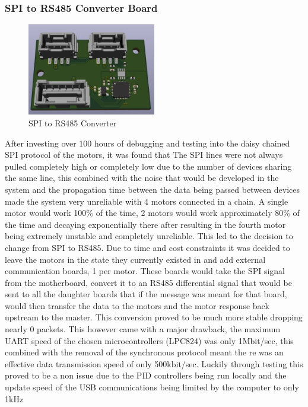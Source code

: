 \subsubsection{SPI to RS485 Converter Board}
\begin{figure}[H]
       \centering
       \includegraphics[width=0.5\textwidth]{figures/ConverterBoard.png}
       \caption{SPI to RS485 Converter}
       \label{fig:SPItoRS485ConverterPCB}
   \end{figure}
   After investing over 100 hours of debugging and testing into the daisy chained SPI protocol of the motors, it was found that The SPI lines were not always pulled completely high or completely low due to the number of devices sharing the same line, this combined with the noise that would be developed in the system and the propagation time between the data being passed between devices made the system very unreliable with 4 motors connected in a chain. A single motor would work 100\% of the time, 2 motors would work approximately 80\% of the time and decaying exponentially there after resulting in the fourth motor being extremely unstable and completely unreliable. This led to the decision to change from SPI to RS485. Due to time and cost constraints it was decided to leave the motors in the state they currently existed in and add external communication boards, 1 per motor. These boards would take the SPI signal from the motherboard, convert it to an RS485 differential signal that would be sent to all the daughter boards that if the message was meant for that board, would then transfer the data to the motors and the motor response back upstream to the master. This conversion proved to be much more stable dropping nearly 0 packets. This however came with a major drawback, the maximum UART speed of the chosen microcontrollers (LPC824) was only 1Mbit/sec, this combined with the removal of the synchronous protocol meant the re was an effective data transmission speed of only 500kbit/sec. Luckily through testing this proved to be a non issue due to the PID controllers being run locally and the update speed of the USB communications being limited by the computer to only 1kHz 

